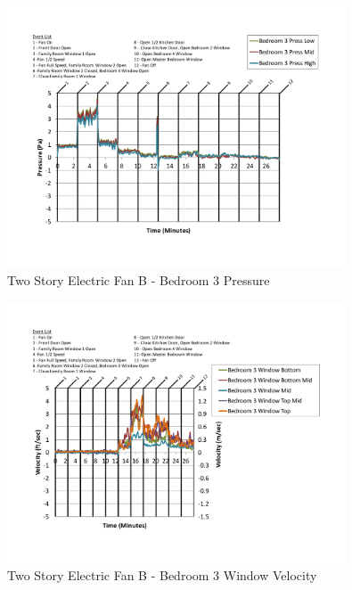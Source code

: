 \documentclass{article}
\begin{document}
\begin{appendices}
	\begin{figure}[H]
		\centering
		\includegraphics[height=3.05in,trim=0.67in 1.1in 0.67in 0.8in,clip=true]{0_Images/Results_Charts/ColdFlow/Two_Story/Electric/B/Bedroom_3_Pressure.pdf}
		\caption{Two Story Electric Fan B - Bedroom 3 Pressure}
	\end{figure}
 

	\begin{figure}[H]
		\centering
		\includegraphics[height=3.05in,trim=0.67in 1.1in 0.67in 0.8in,clip=true]{0_Images/Results_Charts/ColdFlow/Two_Story/Electric/B/Bedroom_3_Window_Velocity.pdf}
		\caption{Two Story Electric Fan B - Bedroom 3 Window Velocity}
	\end{figure}
 
	\clearpage


\end{appendices}
\end{document}
